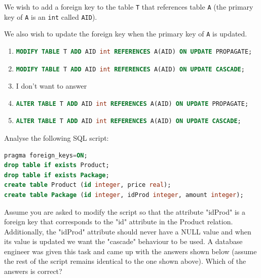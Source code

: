 \documentclass{bdad}
\begin{document}
\newpage
{}
We wish to add a foreign key to the table \texttt{T} that references table \texttt{A} (the primary key of \texttt{A} is an \texttt{int} called \texttt{AID}).

We also wish to update the foreign key when the primary key of \texttt{A} is updated.

\begin{enumerate}
    \item
    \begin{lstlisting}[language=SQL, numbers=none, frame=none, belowskip=0pt]
MODIFY TABLE T ADD AID int REFERENCES A(AID) ON UPDATE PROPAGATE;
    \end{lstlisting}

    \item
    \begin{lstlisting}[language=SQL, numbers=none, frame=none, belowskip=0pt]
MODIFY TABLE T ADD AID int REFERENCES A(AID) ON UPDATE CASCADE;
    \end{lstlisting}

    \item I don't want to answer

    \item
    \begin{lstlisting}[language=SQL, numbers=none, frame=none, belowskip=0pt]
ALTER TABLE T ADD AID int REFERENCES A(AID) ON UPDATE PROPAGATE;
    \end{lstlisting}

    \item
    \begin{lstlisting}[language=SQL, numbers=none, frame=none, belowskip=0pt]
ALTER TABLE T ADD AID int REFERENCES A(AID) ON UPDATE CASCADE;
    \end{lstlisting} \greencheckmark
\end{enumerate}

Analyse the following SQL script:

\begin{lstlisting}[language=SQL]
pragma foreign_keys=ON;
drop table if exists Product;
drop table if exists Package;
create table Product (id integer, price real);
create table Package (id integer, idProd integer, amount integer);
\end{lstlisting}

Assume you are asked to modify the script so that the attribute "idProd" is a foreign key that corresponds to the "id" attribute in the Product relation. Additionally, the "idProd" attribute should never have a NULL value and when its value is updated we want the "cascade" behaviour to be used. A database engineer was given this task and came up with the answers shown below (assume the rest of the script remains identical to the one shown above). Which of the answers is correct?
\end{document}
